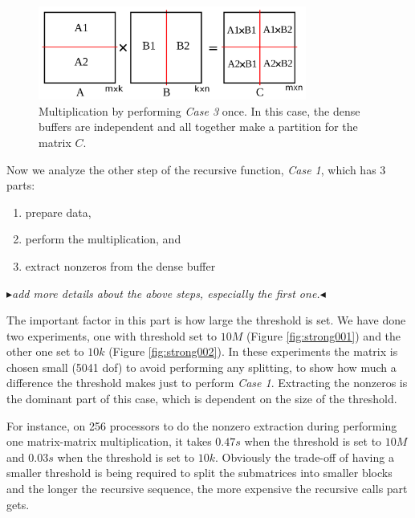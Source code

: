 \documentclass[conference,10pt]{IEEEtran}
\newcommand{\mr}[1]{\mynote{Majid}{blue}{#1}}
\newcommand{\mynote}[3]{
	\textcolor{#2}{\fbox{\bfseries\sffamily\scriptsize#1}}
		{\small$\blacktriangleright$\textsf{\emph{#3}}$\blacktriangleleft$}
}
\begin{document}
\begin{figure}[thb]
    \includegraphics[width=8.8cm,height=3.1cm]{./figures/skinny002.pdf}
    \caption{Multiplication by performing \textit{Case 3} once. In this case, the dense buffers are independent and all together make a partition for the matrix $C$.}
    \label{fig:skinny2}
\end{figure}

Now we analyze the other step of the recursive function, \textit{Case 1}, which has $3$ parts:
\begin{enumerate}
 \item prepare data,
 \item perform the multiplication, and
 \item extract nonzeros from the dense buffer
\end{enumerate}

\mr{add more details about the above steps, especially the first one.}

The important factor in this part is how large the threshold is set. We have done two experiments, one with threshold set to $10M$ (Figure \ref{fig:strong001}) and the other one set to $10k$ (Figure \ref{fig:strong002}). In these experiments the matrix is chosen small (5041 dof) to avoid performing any splitting, to show how much a difference the threshold makes just to perform \textit{Case 1}. Extracting the nonzeros is the dominant part of this case, which is dependent on the size of the threshold.

For instance, on 256 processors to do the nonzero extraction during performing one matrix-matrix multiplication, it takes $0.47s$ when the threshold is set to $10M$ and $0.03s$ when the threshold is set to $10k$. Obviously the trade-off of having a smaller threshold is being required to split the submatrices into smaller blocks and the longer the recursive sequence, the more expensive the recursive calls part gets.

\newpage
\end{document}
